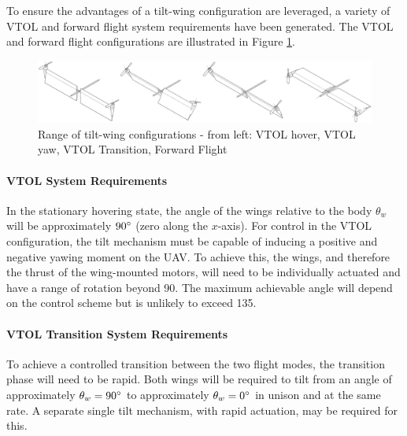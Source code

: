 To ensure the advantages of a tilt-wing configuration are leveraged, a variety of VTOL and forward flight system requirements have been generated. The VTOL and forward flight configurations are illustrated in Figure \ref{fig:configs}.\\
\begin{figure}[H]
    \centering
    \includegraphics[width = \textwidth]{Tiltwing/TiltWingConfigurations.png}
    \caption{Range of tilt-wing configurations - from left: VTOL hover, VTOL yaw, VTOL Transition, Forward Flight}
    \label{fig:configs}
\end{figure}

\paragraph{VTOL System Requirements}
In the stationary hovering state, the angle of the wings relative to the body \(\theta_w\) will be approximately \(90\degree\) (zero along the $x$-axis). For control in the VTOL configuration, the tilt mechanism must be capable of inducing a positive and negative yawing moment on the UAV. To achieve this, the wings, and therefore the thrust of the wing-mounted motors, will need to be individually actuated and have a range of rotation beyond 90\degree. The maximum achievable angle will depend on the control scheme but is unlikely to exceed 135\degree.  \\

\paragraph{VTOL Transition System Requirements}
To achieve a controlled transition between the two flight modes, the transition phase will need to be rapid. Both wings will be required to tilt from an angle of approximately \(\theta_w=90\degree\) to approximately \(\theta_w=0\degree\) in unison and at the same rate. A separate single tilt mechanism, with rapid actuation, may be required for this.\\

